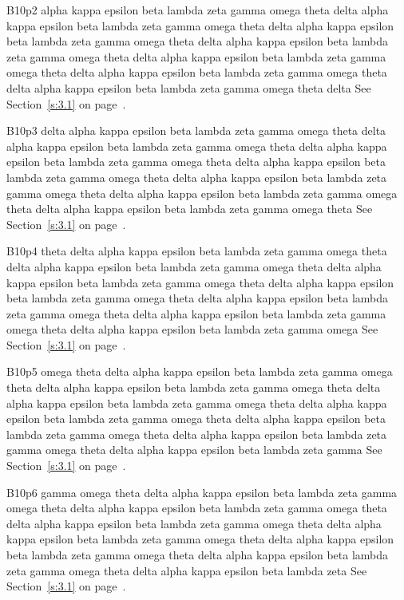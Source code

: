B10p2 alpha kappa epsilon beta lambda zeta gamma omega theta delta alpha kappa epsilon beta lambda zeta gamma omega theta delta alpha kappa epsilon beta lambda zeta gamma omega theta delta alpha kappa epsilon beta lambda zeta gamma omega theta delta alpha kappa epsilon beta lambda zeta gamma omega theta delta alpha kappa epsilon beta lambda zeta gamma omega theta delta alpha kappa epsilon beta lambda zeta gamma omega theta delta See Section~\ref{s:3.1} on page~\pageref{s:3.1}.

B10p3 delta alpha kappa epsilon beta lambda zeta gamma omega theta delta alpha kappa epsilon beta lambda zeta gamma omega theta delta alpha kappa epsilon beta lambda zeta gamma omega theta delta alpha kappa epsilon beta lambda zeta gamma omega theta delta alpha kappa epsilon beta lambda zeta gamma omega theta delta alpha kappa epsilon beta lambda zeta gamma omega theta delta alpha kappa epsilon beta lambda zeta gamma omega theta See Section~\ref{s:3.1} on page~\pageref{s:3.1}.

B10p4 theta delta alpha kappa epsilon beta lambda zeta gamma omega theta delta alpha kappa epsilon beta lambda zeta gamma omega theta delta alpha kappa epsilon beta lambda zeta gamma omega theta delta alpha kappa epsilon beta lambda zeta gamma omega theta delta alpha kappa epsilon beta lambda zeta gamma omega theta delta alpha kappa epsilon beta lambda zeta gamma omega theta delta alpha kappa epsilon beta lambda zeta gamma omega See Section~\ref{s:3.1} on page~\pageref{s:3.1}.

B10p5 omega theta delta alpha kappa epsilon beta lambda zeta gamma omega theta delta alpha kappa epsilon beta lambda zeta gamma omega theta delta alpha kappa epsilon beta lambda zeta gamma omega theta delta alpha kappa epsilon beta lambda zeta gamma omega theta delta alpha kappa epsilon beta lambda zeta gamma omega theta delta alpha kappa epsilon beta lambda zeta gamma omega theta delta alpha kappa epsilon beta lambda zeta gamma See Section~\ref{s:3.1} on page~\pageref{s:3.1}.

B10p6 gamma omega theta delta alpha kappa epsilon beta lambda zeta gamma omega theta delta alpha kappa epsilon beta lambda zeta gamma omega theta delta alpha kappa epsilon beta lambda zeta gamma omega theta delta alpha kappa epsilon beta lambda zeta gamma omega theta delta alpha kappa epsilon beta lambda zeta gamma omega theta delta alpha kappa epsilon beta lambda zeta gamma omega theta delta alpha kappa epsilon beta lambda zeta See Section~\ref{s:3.1} on page~\pageref{s:3.1}.

